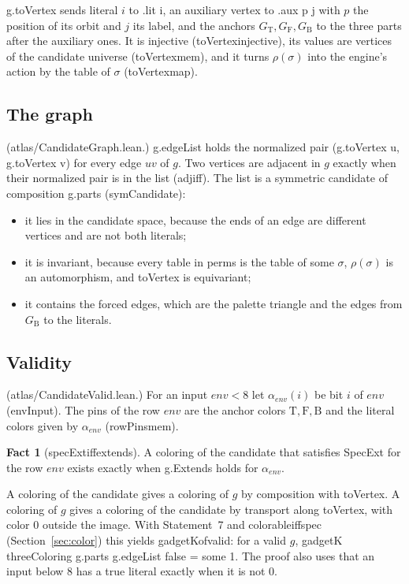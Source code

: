 \documentclass[11pt,a4paper]{article}
\newcommand{\leanus}{\textunderscore\allowbreak}
\newcommand{\lean}[1]{{\ttfamily\let\_\leanus #1}}
\newcommand{\GT}{G_{\mathrm{T}}}
\newcommand{\GF}{G_{\mathrm{F}}}
\newcommand{\GB}{G_{\mathrm{B}}}
\newcommand{\T}{\mathrm{T}}
\newcommand{\F}{\mathrm{F}}
\newcommand{\B}{\mathrm{B}}
\theoremstyle{definition}
\newtheorem{fact}{Fact}
\begin{document}
\lean{g.toVertex} sends literal $i$ to \lean{.lit i}, an auxiliary vertex to
\lean{.aux p j} with $p$ the position of its orbit and $j$ its label, and the
anchors $\GT,\GF,\GB$ to the three parts after the auxiliary ones. It is
injective (\lean{toVertex\_injective}), its values are vertices of the
candidate universe (\lean{toVertex\_mem}), and it turns $\rho(\sigma)$ into
the engine's action by the table of $\sigma$ (\lean{toVertex\_map}).

\subsection{The graph}
(\lean{atlas/CandidateGraph.lean}.) \lean{g.edgeList} holds the normalized
pair \lean{(g.toVertex u, g.toVertex v)} for every edge $uv$ of $g$. Two
vertices are adjacent in $g$ exactly when their normalized pair is in the
list (\lean{adj\_iff}). The list is a symmetric candidate of composition
\lean{g.parts} (\lean{symCandidate}):
\begin{itemize}
\item it lies in the candidate space, because the ends of an edge are
different vertices and are not both literals;
\item it is invariant, because every table in \lean{perms} is the table of
some $\sigma$, $\rho(\sigma)$ is an automorphism, and \lean{toVertex} is
equivariant;
\item it contains the forced edges, which are the palette triangle and the
edges from $\GB$ to the literals.
\end{itemize}

\subsection{Validity}\label{sec:valid}
(\lean{atlas/CandidateValid.lean}.) For an input $\mathit{env}<8$ let
$\alpha_{\mathit{env}}(i)$ be bit $i$ of $\mathit{env}$ (\lean{envInput}).
The pins of the row $\mathit{env}$ are the anchor colors $\T,\F,\B$ and the
literal colors given by $\alpha_{\mathit{env}}$ (\lean{rowPins\_mem}).

\begin{fact}[\lean{specExt\_iff\_extends}]
A coloring of the candidate that satisfies \lean{SpecExt} for the row
$\mathit{env}$ exists exactly when \lean{g.Extends} holds for
$\alpha_{\mathit{env}}$.
\end{fact}

A coloring of the candidate gives a coloring of $g$ by composition with
\lean{toVertex}. A coloring of $g$ gives a coloring of the candidate by
transport along \lean{toVertex}, with color 0 outside the image. With
Statement~7 and \lean{colorable\_iff\_spec} (Section~\ref{sec:color}) this
yields \lean{gadgetK\_of\_valid}: for a valid $g$,
\lean{gadgetK threeColoring g.parts g.edgeList false = some 1}. The proof
also uses that an input below 8 has a true literal exactly when it is not 0.
\end{document}
